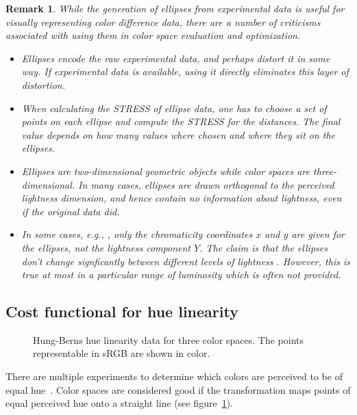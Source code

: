 \documentclass{scrartcl}
\newtheorem*{remark}{Remark}
\theoremstyle{named}
\begin{document}
\begin{remark}
  While the generation of ellipses from experimental data is useful for visually
  representing color difference data, there are a number of criticisms associated with
  using them in color space evaluation and optimization.
  \begin{itemize}
    \item Ellipses encode the raw experimental data, and perhaps distort it in some way.
      If experimental data is available, using it directly eliminates this layer of
      distortion.
    \item When calculating the STRESS of ellipse data, one has to choose a set of points
      on each ellipse and compute the STRESS for the distances. The final value depends
      on how many values where chosen and where they sit on the ellipses.
    \item Ellipses are two-dimensional geometric objects while color spaces are
      three-dimensional. In many cases, ellipses are drawn orthogonal to the perceived
      lightness dimension, and hence contain no information about lightness, even if the
      original data did.
    \item In some cases, e.g., \cite{macadam1942}, only the chromaticity coordinates $x$
      and $y$ are given for the ellipses, not the lightness component $Y$. The claim is
      that the ellipses don't change signficantly between different levels of lightness
      \cite{brown}. However, this is true at most in a particular range of luminosity
      which is often not provided.
    \end{itemize}
\end{remark}


\subsection{Cost functional for hue linearity}

\begin{figure}
  \centering
  
  \hfill
  
  \hfill
  
  \caption{Hung-Berns \cite{hung} hue linearity data for three color spaces. The points
  representable in sRGB are shown in color.}
  \label{fig:hung}
\end{figure}

There are multiple experiments to determine which colors are perceived to be of equal
hue~\cite{hung,ebner,xiao}. Color spaces are considered good if the transformation maps
points of equal perceived hue onto a straight line (see figure~\ref{fig:hung}).
\end{document}
